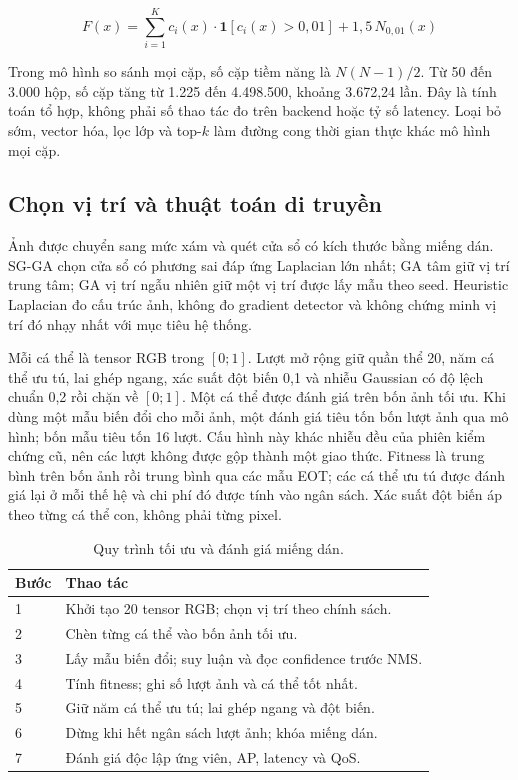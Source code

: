 \documentclass[a4paper,fleqn]{cas-dc}
\begin{document}
\begin{equation}
F(x) = \sum_{i=1}^{K} c_i(x)\cdot\mathbf{1}[c_i(x) > 0{,}01] + 1{,}5\,N_{0{,}01}(x)
\tag{2}
\end{equation}

Trong mô hình so sánh mọi cặp, số cặp tiềm năng là $N(N{-}1)/2$. Từ 50 đến 3.000 hộp, số cặp tăng từ 1.225 đến 4.498.500, khoảng 3.672,24 lần. Đây là tính toán tổ hợp, không phải số thao tác đo trên backend hoặc tỷ số latency. Loại bỏ sớm, vector hóa, lọc lớp và top-$k$ làm đường cong thời gian thực khác mô hình mọi cặp.

\subsection{Chọn vị trí và thuật toán di truyền}

Ảnh được chuyển sang mức xám và quét cửa sổ có kích thước bằng miếng dán. SG-GA chọn cửa sổ có phương sai đáp ứng Laplacian lớn nhất; GA tâm giữ vị trí trung tâm; GA vị trí ngẫu nhiên giữ một vị trí được lấy mẫu theo seed. Heuristic Laplacian đo cấu trúc ảnh, không đo gradient detector và không chứng minh vị trí đó nhạy nhất với mục tiêu hệ thống.

Mỗi cá thể là tensor RGB trong $[0;1]$. Lượt mở rộng giữ quần thể 20, năm cá thể ưu tú, lai ghép ngang, xác suất đột biến 0,1 và nhiễu Gaussian có độ lệch chuẩn 0,2 rồi chặn về $[0;1]$. Một cá thể được đánh giá trên bốn ảnh tối ưu. Khi dùng một mẫu biến đổi cho mỗi ảnh, một đánh giá tiêu tốn bốn lượt ảnh qua mô hình; bốn mẫu tiêu tốn 16 lượt. Cấu hình này khác nhiễu đều của phiên kiểm chứng cũ, nên các lượt không được gộp thành một giao thức. Fitness là trung bình trên bốn ảnh rồi trung bình qua các mẫu EOT; các cá thể ưu tú được đánh giá lại ở mỗi thế hệ và chi phí đó được tính vào ngân sách. Xác suất đột biến áp theo từng cá thể con, không phải từng pixel.

\begin{table}[t]
\centering
\small
\caption{Quy trình tối ưu và đánh giá miếng dán.}
\begin{tabularx}{\textwidth}{@{}X X @{}}
\toprule
\textbf{Bước} & \textbf{Thao tác} \\
\midrule
1 & Khởi tạo 20 tensor RGB; chọn vị trí theo chính sách. \\
2 & Chèn từng cá thể vào bốn ảnh tối ưu. \\
3 & Lấy mẫu biến đổi; suy luận và đọc confidence trước NMS. \\
4 & Tính fitness; ghi số lượt ảnh và cá thể tốt nhất. \\
5 & Giữ năm cá thể ưu tú; lai ghép ngang và đột biến. \\
6 & Dừng khi hết ngân sách lượt ảnh; khóa miếng dán. \\
7 & Đánh giá độc lập ứng viên, AP, latency và QoS. \\
\bottomrule
\end{tabularx}
\label{tab:algorithm}
\end{table}
\end{document}

